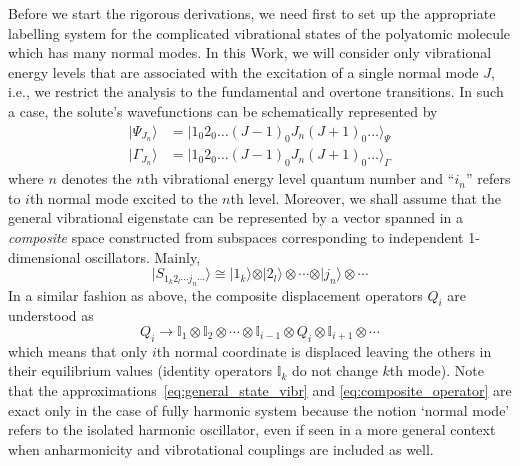 \documentclass[a4paper,titlepage,twoside,fleqn,12pt]{book}
\begin{document}
\begin{refsection}
Before we start the rigorous derivations, we need first to set up the appropriate labelling system
for the complicated vibrational states of the polyatomic molecule which has many normal modes.
In this Work, we will consider only vibrational energy levels that are associated with
the excitation of a single normal mode $J$, i.e., we restrict the analysis to the fundamental
and overtone transitions. In such a case, the 
solute's wavefunctions can be schematically represented by
%
\begin{subequations}
\begin{align}
\vert \Psi_{J_n}   \rangle &= \vert 1_0 2_0 \ldots (J-1)_0 J_n (J+1)_0 \ldots \rangle_{\Psi}   \label{eq:wfn-1-solvated} \\ 
\vert \Gamma_{J_n} \rangle &= \vert 1_0 2_0 \ldots (J-1)_0 J_n (J+1)_0 \ldots \rangle_{\Gamma} \label{eq:wfn-2-gas-phase}
\end{align}
\end{subequations}
%
where $n$ denotes the $n$th vibrational energy level quantum number
and ``$i_n$'' refers to $i$th normal mode excited to the $n$th level.
Moreover, we shall assume that the general vibrational 
eigenstate can be represented by a vector spanned
in a \emph{composite} space constructed from subspaces corresponding 
to independent 1\hyp{}dimensional oscillators. Mainly,
%
\begin{equation}  \label{eq:general_state_vibr}
\vert S_{1_k2_l\cdots j_n\cdots}   \rangle 
 \cong 
 \vert 1_k \rangle \otimes 
 \vert 2_l \rangle \otimes \cdots \otimes
 \vert j_n \rangle \otimes \cdots 
\end{equation}
%
In a similar fashion as above, the composite displacement operators $Q_i$
are understood as
%
\begin{equation} \label{eq:composite_operator}
Q_i \rightarrow \mathbb{I}_1 \otimes \mathbb{I}_2 \otimes \cdots \otimes 
 \mathbb{I}_{i-1} \otimes Q_i \otimes \mathbb{I}_{i+1} \otimes \cdots
\end{equation}
%
which means that only $i$th normal coordinate is displaced leaving the others
in their equilibrium values (identity operators $\mathbb{I}_k$ do not change $k$th mode).
%
Note that the approximations~\eqref{eq:general_state_vibr} and \eqref{eq:composite_operator} 
are exact only in the case of 
fully harmonic system because the notion `normal mode' refers to
the isolated harmonic oscillator, even if seen in a more general context
when anharmonicity and vibrotational couplings are included as well.


\end{refsection}
\end{document}
